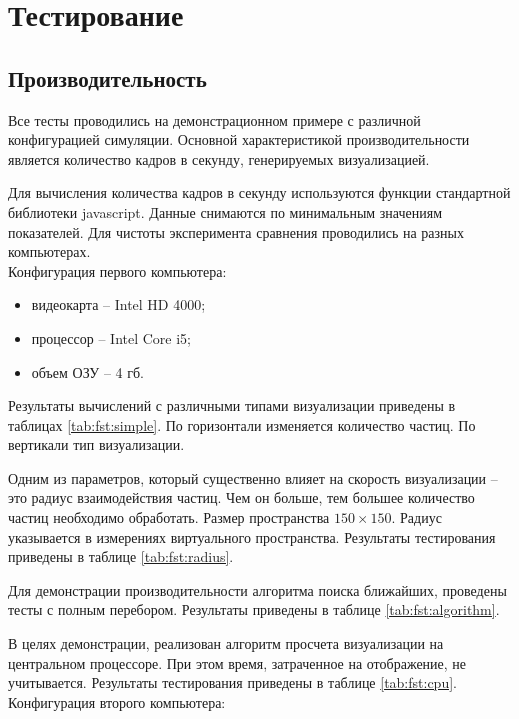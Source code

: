 \newpage
\section{Тестирование}

\subsection{Производительность}

Все тесты проводились на демонстрационном примере с различной конфигурацией
симуляции. Основной характеристикой производительности является количество 
кадров в секунду, генерируемых визуализацией.

Для вычисления количества кадров в секунду используются функции стандартной 
библиотеки javascript. Данные снимаются по минимальным значениям показателей.
Для чистоты эксперимента сравнения проводились на разных компьютерах. \\

Конфигурация первого компьютера:

\begin{itemize}
  \item видеокарта -- Intel HD 4000;
  \item процессор -- Intel Core i5;
  \item объем ОЗУ -- 4 гб.
\end{itemize}

Результаты вычислений с различными типами визуализации приведены 
в таблицах \ref{tab:fst:simple}. По горизонтали изменяется количество частиц.
По вертикали тип визуализации.

Одним из параметров, который существенно влияет на скорость визуализации -- это
радиус взаимодействия частиц. Чем он больше, тем большее количество частиц необходимо
обработать. Размер пространства $150\times150$. Радиус указывается в измерениях
виртуального пространства. Результаты тестирования приведены в таблице \ref{tab:fst:radius}.

Для демонстрации производительности алгоритма поиска ближайших, проведены
тесты с полным перебором. Результаты приведены в таблице \ref{tab:fst:algorithm}.

В целях демонстрации, реализован алгоритм просчета визуализации на центральном процессоре.
При этом время, затраченное на отображение, не учитывается. Результаты тестирования 
приведены в таблице \ref{tab:fst:cpu}.  \\

Конфигурация второго компьютера:


